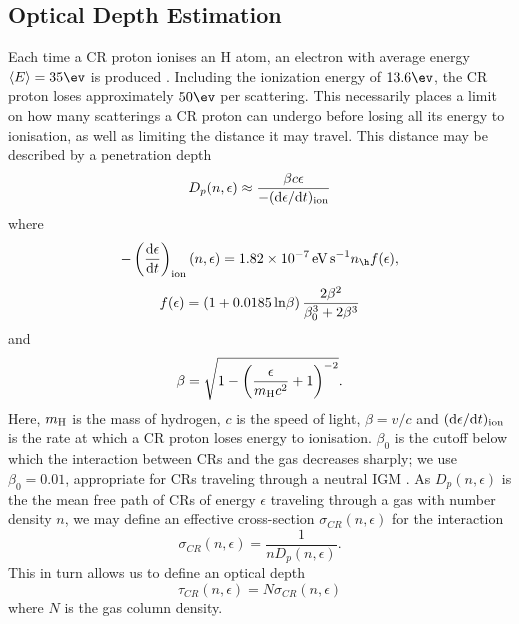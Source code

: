 \subsection{Optical Depth Estimation}
\label{attenuation}
Each time a CR proton ionises an H atom, an electron with average energy $\langle E \rangle = 35\ev$ is produced \citep{SpitzerTomasko1968}.  Including the ionization energy of $13.6\ev$, the CR proton loses approximately $50\ev$ per scattering. This necessarily places a limit on how many scatterings a CR proton can undergo before losing all its energy to ionisation, as well as limiting the distance it may travel.  This distance may be described by a penetration depth 
\begin{equation}
    D_p(n, \epsilon) \approx \frac{\beta c \epsilon} {-({\rm d}\epsilon / {\rm d}t)_{\rm ion}}
\end{equation}
where \citep{Schlickeiser2002}
\begin{equation}
    - \left( \frac{{\rm d}\epsilon} {{\rm d}t} \right)_{\rm ion}(n, \epsilon)
    = 1.82\times10^{-7}\,{\rm \small eV\,s}^{-1} n_{\h} f(\epsilon),
\end{equation}
\begin{equation}    
    f(\epsilon) = (1 + 0.0185 \,{\rm ln}\beta )\, \frac{2 \beta^2}{\beta_0^3 + 2 \beta^3}
\end{equation}
and 
\begin{equation}
    \beta =  \sqrt{1 - \left( \frac{\epsilon}{m_{\rm \tiny H}c^2}+1 \right)^{-2}}.
\end{equation}
Here, $m_{\rm \small H}$ is the mass of hydrogen, $c$ is the speed of light, $\beta = v/c$ and $({\rm d}\epsilon / {\rm d}t)_{\rm ion}$ is the rate at which a CR proton loses energy to ionisation. $\beta_0$ is the cutoff below which the interaction between CRs and the gas decreases sharply; we use $\beta_0=0.01$, appropriate for CRs traveling through a neutral IGM \citep{StacyBromm2007}.
As $D_p(n, \epsilon)$ is the the mean free path of CRs of energy $\epsilon$ traveling through a gas with number density $n$, we may define an effective cross-section $\sigma_{CR}(n,\epsilon)$ for the interaction
\begin{equation}
\sigma_{CR}(n,\epsilon) = \frac{1}{n D_p(n, \epsilon)}.
\end{equation}
This in turn allows us to define an optical depth
\begin{equation}
\tau_{CR}(n,\epsilon) = N \sigma_{CR}(n,\epsilon)
\end{equation}
where $N$ is the gas column density.

